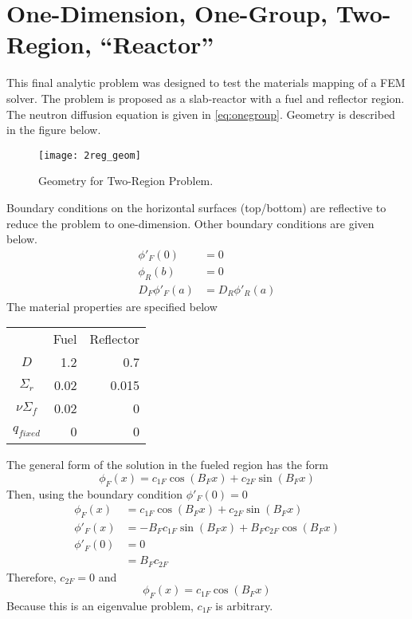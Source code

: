 \section{One-Dimension, One-Group, Two-Region, ``Reactor''}
  This final analytic problem was designed to test the materials mapping of a
  FEM solver. The problem is proposed as a slab-reactor with a fuel and 
  reflector region. The neutron diffusion equation is given in 
  \eqref{eq:onegroup}. Geometry is described in the figure below.
  \begin{figure}[H] 
    \centering
    \texttt{[image: 2reg\_geom]}
    \caption{Geometry for Two-Region Problem.}
    \label{fg:2reg_geom}
  \end{figure}
  Boundary conditions on the horizontal surfaces (top/bottom) are reflective
  to reduce the problem to one-dimension. Other boundary conditions are given
  below.
  \begin{align}
    \phi'_F(0)&=0\\
    \phi_R(b)&=0\\
    D_F\phi'_F(a)&=D_R\phi'_R(a)
  \end{align}
  The material properties are specified below
  \begin{center}
  \begin{tabular}{c r r}
    & Fuel & Reflector\\
    $D$ & 1.2 & 0.7 \\
    $\Sigma_r$ & 0.02 & 0.015 \\
    $\nu \Sigma_f$ & 0.02 & 0 \\
    $q_{fixed}$ & 0 & 0
  \end{tabular}
  \end{center}
  The general form of the solution in the fueled region has the form 
  \[ \phi_F(x) = c_{1F} \cos(B_F x) + c_{2F} \sin(B_F x) \]
  Then, using the boundary condition $\phi'_F(0)=0$
  \begin{align}
    \phi_F(x) &= c_{1F} \cos(B_F x) + c_{2F} \sin(B_F x) \\
    \phi'_F(x) &= -B_F c_{1F} \sin(B_F x) + B_F c_{2F} \cos(B_F x) \\
    \phi'_F(0) &= 0\\
    &=B_F c_{2F}
  \end{align}
  Therefore, $c_{2F}=0$ and
  \begin{equation}
    \phi_F(x) = c_{1F} \cos(B_F x)
  \end{equation}
  Because this is an eigenvalue problem, $c_{1F}$ is arbitrary.
  
